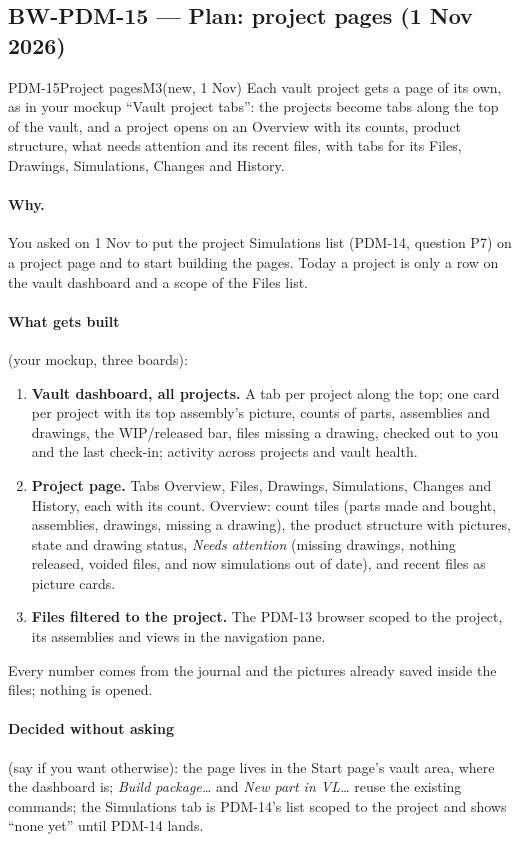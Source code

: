 \subsection{BW-PDM-15 --- Plan: project pages (1 Nov 2026)}\label{sec:pdm15-plan}

\begin{epic}{PDM-15}{Project pages}{M3}{\stTodo}{(new, 1 Nov)}
Each vault project gets a page of its own, as in your mockup ``Vault project tabs'': the projects become tabs along
the top of the vault, and a project opens on an Overview with its counts, product structure, what needs attention and
its recent files, with tabs for its Files, Drawings, Simulations, Changes and History.
\end{epic}

\paragraph{Why.} You asked on 1 Nov to put the project Simulations list (PDM-14, question P7) on a project page and
to start building the pages. Today a project is only a row on the vault dashboard and a scope of the Files list.

\paragraph{What gets built} (your mockup, three boards):
\begin{enumerate}[nosep]
  \item \textbf{Vault dashboard, all projects.} A tab per project along the top; one card per project with its top
        assembly's picture, counts of parts, assemblies and drawings, the WIP/released bar, files missing a drawing,
        checked out to you and the last check-in; activity across projects and vault health.
  \item \textbf{Project page.} Tabs Overview, Files, Drawings, Simulations, Changes and History, each with its count.
        Overview: count tiles (parts made and bought, assemblies, drawings, missing a drawing), the product structure
        with pictures, state and drawing status, \emph{Needs attention} (missing drawings, nothing released, voided
        files, and now simulations out of date), and recent files as picture cards.
  \item \textbf{Files filtered to the project.} The PDM-13 browser scoped to the project, its assemblies and views
        in the navigation pane.
\end{enumerate}
Every number comes from the journal and the pictures already saved inside the files; nothing is opened.

\paragraph{Decided without asking} (say if you want otherwise): the page lives in the Start page's vault area, where
the dashboard is; \emph{Build package\ldots} and \emph{New part in VL\ldots} reuse the existing commands; the
Simulations tab is PDM-14's list scoped to the project and shows ``none yet'' until PDM-14 lands.
